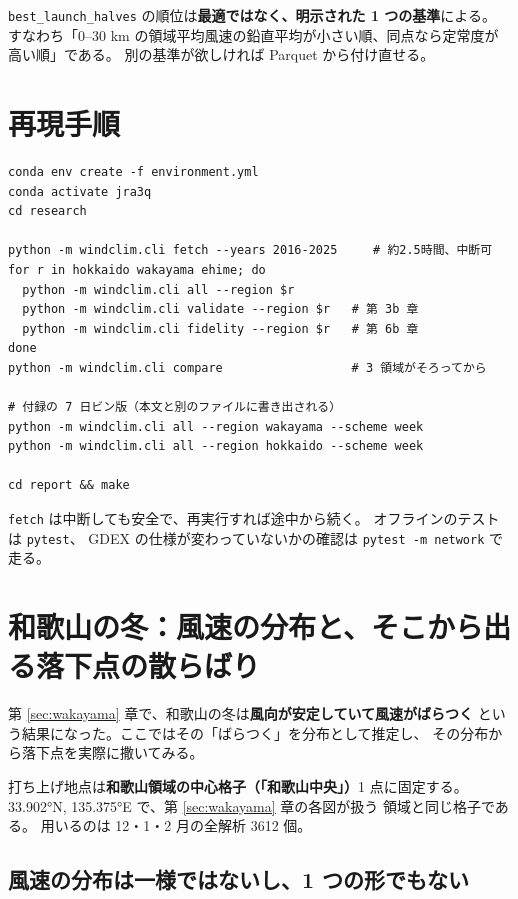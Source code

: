\texttt{best\_launch\_halves} の順位は\textbf{最適ではなく、明示された 1 つの基準}による。
すなわち「0--30 km の領域平均風速の鉛直平均が小さい順、同点なら定常度が高い順」である。
別の基準が欲しければ Parquet から付け直せる。

\section{再現手順}

\codeblock
\begin{lstlisting}
conda env create -f environment.yml
conda activate jra3q
cd research

python -m windclim.cli fetch --years 2016-2025     # 約2.5時間、中断可
for r in hokkaido wakayama ehime; do
  python -m windclim.cli all --region $r
  python -m windclim.cli validate --region $r   # 第 3b 章
  python -m windclim.cli fidelity --region $r   # 第 6b 章
done
python -m windclim.cli compare                  # 3 領域がそろってから

# 付録の 7 日ビン版（本文と別のファイルに書き出される）
python -m windclim.cli all --region wakayama --scheme week
python -m windclim.cli all --region hokkaido --scheme week

cd report && make
\end{lstlisting}

\texttt{fetch} は中断しても安全で、再実行すれば途中から続く。
オフラインのテストは \texttt{pytest}、
GDEX の仕様が変わっていないかの確認は \texttt{pytest -m network} で走る。

\section{和歌山の冬：風速の分布と、そこから出る落下点の散らばり}
\label{sec:appendix-winter}

第 \ref{sec:wakayama} 章で、和歌山の冬は\textbf{風向が安定していて風速がばらつく}
という結果になった。ここではその「ばらつく」を分布として推定し、
その分布から落下点を実際に撒いてみる。

打ち上げ地点は\textbf{和歌山領域の中心格子（「和歌山中央」）}1 点に固定する。
\ang{33.902}N, \ang{135.375}E で、第 \ref{sec:wakayama} 章の各図が扱う
領域と同じ格子である。
用いるのは 12・1・2 月の全解析 \num{3612} 個。

\subsection{風速の分布は一様ではないし、1 つの形でもない}

